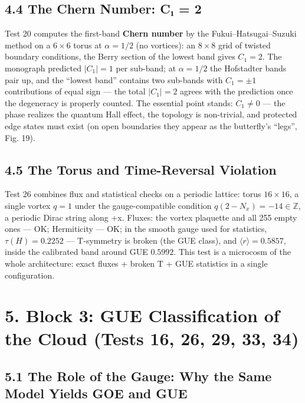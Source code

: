 \documentclass[
]{article}
\begin{document}
\subsection{4.4 The Chern Number: C₁ =
2}\label{the-chern-number-cux2081-2}

Test 20 computes the first-band \textbf{Chern number} by the
Fukui--Hatsugai--Suzuki method on a \(6\times6\) torus at \(\alpha=1/2\)
(no vortices): an \(8\times8\) grid of twisted boundary conditions, the
Berry section of the lowest band gives \(C_1 = 2\). The monograph
predicted \(|C_1|=1\) per sub-band; at \(\alpha=1/2\) the Hofstadter
bands pair up, and the ``lowest band'' contains two sub-bands with
\(C_1=\pm1\) contributions of equal sign --- the total \(|C_1|=2\)
agrees with the prediction once the degeneracy is properly counted. The
essential point stands: \(C_1\neq0\) --- the phase realizes the quantum
Hall effect, the topology is non-trivial, and protected edge states must
exist (on open boundaries they appear as the butterfly's ``legs'', Fig.
19).

\subsection{4.5 The Torus and Time-Reversal
Violation}\label{the-torus-and-time-reversal-violation}

Test 26 combines flux and statistical checks on a periodic lattice:
torus \(16\times16\), a single vortex \(q=1\) under the gauge-compatible
condition \(q(2-N_x) = -14\in\mathbb{Z}\), a periodic Dirac string along
+x. Fluxes: the vortex plaquette and all 255 empty ones --- OK;
Hermiticity --- OK; in the smooth gauge used for statistics,
\(\tau(H) = 0.2252\) --- T-symmetry is broken (the GUE class), and
\(\langle r\rangle = 0.5857\), inside the calibrated band around GUE
\(0.5992\). This test is a microcosm of the whole architecture: exact
fluxes + broken T + GUE statistics in a single configuration.

\section{5. Block 3: GUE Classification of the Cloud (Tests 16, 26, 29,
33,
34)}\label{block-3-gue-classification-of-the-cloud-tests-16-26-29-33-34}

\subsection{5.1 The Role of the Gauge: Why the Same Model Yields GOE and
GUE}\label{the-role-of-the-gauge-why-the-same-model-yields-goe-and-gue}
\end{document}

